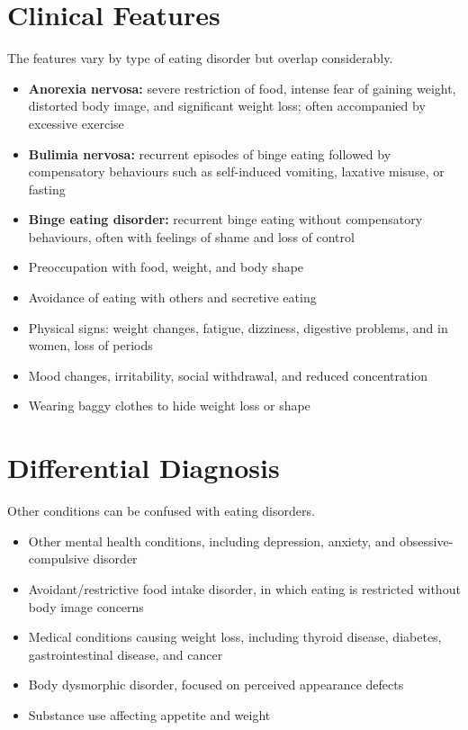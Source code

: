 \section*{Clinical Features}
The features vary by type of eating disorder but overlap considerably.
\begin{itemize}
    \item \textbf{Anorexia nervosa:} severe restriction of food, intense fear of gaining weight, distorted body image, and significant weight loss; often accompanied by excessive exercise
    \item \textbf{Bulimia nervosa:} recurrent episodes of binge eating followed by compensatory behaviours such as self-induced vomiting, laxative misuse, or fasting
    \item \textbf{Binge eating disorder:} recurrent binge eating without compensatory behaviours, often with feelings of shame and loss of control
    \item Preoccupation with food, weight, and body shape
    \item Avoidance of eating with others and secretive eating
    \item Physical signs: weight changes, fatigue, dizziness, digestive problems, and in women, loss of periods
    \item Mood changes, irritability, social withdrawal, and reduced concentration
    \item Wearing baggy clothes to hide weight loss or shape
\end{itemize}

\section*{Differential Diagnosis}
Other conditions can be confused with eating disorders.
\begin{itemize}
    \item Other mental health conditions, including depression, anxiety, and obsessive-compulsive disorder
    \item Avoidant/restrictive food intake disorder, in which eating is restricted without body image concerns
    \item Medical conditions causing weight loss, including thyroid disease, diabetes, gastrointestinal disease, and cancer
    \item Body dysmorphic disorder, focused on perceived appearance defects
    \item Substance use affecting appetite and weight
\end{itemize}

